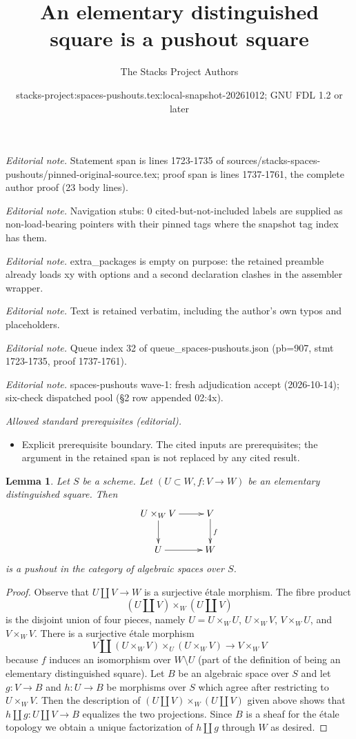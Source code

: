 \documentclass[10pt,a4paper]{amsart}
\title{An elementary distinguished square is a pushout square}
\author{The Stacks Project Authors}
\date{stacks-project:spaces-pushouts.tex:local-snapshot-20261012; GNU FDL 1.2 or later}
\theoremstyle{plain}
\newtheorem{lemma}[subsection]{Lemma}
\theoremstyle{definition}
\theoremstyle{remark}
\numberwithin{equation}{subsection}
\begin{document}
\maketitle
\noindent\textit{Editorial note.} Statement span is lines 1723-1735 of sources/stacks-spaces-pushouts/pinned-original-source.tex; proof span is lines 1737-1761, the complete author proof (23 body lines).\par\medskip
\noindent\textit{Editorial note.} Navigation stubs: 0 cited-but-not-included labels are supplied as non-load-bearing pointers with their pinned tags where the snapshot tag index has them.\par\medskip
\noindent\textit{Editorial note.} extra\_packages is empty on purpose: the retained preamble already loads xy with options and a second declaration clashes in the assembler wrapper.\par\medskip
\noindent\textit{Editorial note.} Text is retained verbatim, including the author's own typos and placeholders.\par\medskip
\noindent\textit{Editorial note.} Queue index 32 of queue\_spaces-pushouts.json (pb=907, stmt 1723-1735, proof 1737-1761).\par\medskip
\noindent\textit{Editorial note.} spaces-pushouts wave-1: fresh adjudication accept (2026-10-14); six-check dispatched pool (§2 row appended 02:4x).\par\medskip
\noindent\textit{Allowed standard prerequisites (editorial).}\begin{itemize}
\item Explicit prerequisite boundary. The cited inputs are prerequisites; the argument in the retained span is not replaced by any cited result.
\end{itemize}\medskip
\begin{lemma}
\label{lemma-elementary-distinguished-square-pushout}
Let $S$ be a scheme. Let $(U \subset W, f : V \to W)$ be
an elementary distinguished square. Then
$$
\xymatrix{
U \times_W V \ar[r] \ar[d] &
V \ar[d]^f \\
U \ar[r] & W
}
$$
is a pushout in the category of algebraic spaces over $S$.
\end{lemma}

\begin{proof}
Observe that $U \amalg V \to W$ is a surjective \'etale morphism.
The fibre product
$$
(U \amalg V) \times_W (U \amalg V)
$$
is the disjoint union of four pieces, namely
$U = U \times_W U$, $U \times_W V$, $V \times_W U$,
and $V \times_W V$.
There is a surjective \'etale morphism
$$
V \amalg (U \times_W V) \times_U (U \times_W V) \longrightarrow V \times_W V
$$
because $f$ induces an isomorphism over $W \setminus U$
(part of the definition of being an elementary distinguished square).
Let $B$ be an algebraic space over $S$ and let
$g : V \to B$ and $h : U \to B$ be morphisms over
$S$ which agree after restricting to $U \times_W V$.
Then the description of
$(U \amalg V) \times_W (U \amalg V)$ given above
shows that $h \amalg g : U \amalg V \to B$
equalizes the two projections. Since $B$ is a sheaf
for the \'etale topology we obtain a unique
factorization of $h \amalg g$ through $W$ as desired.
\end{proof}
\end{document}
